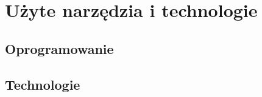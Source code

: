 \chapter{Użyte narzędzia i technologie}\label{chap:technologie}

\section{Oprogramowanie}

\section{Technologie}
